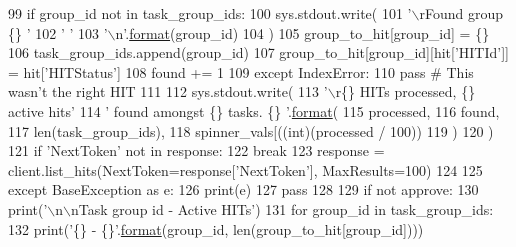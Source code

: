 \begin{DoxyCode}
99                         \textcolor{keywordflow}{if} group\_id \textcolor{keywordflow}{not} \textcolor{keywordflow}{in} task\_group\_ids:
100                             sys.stdout.write(
101                                 \textcolor{stringliteral}{'\(\backslash\)rFound group \{\}                         '}
102                                 \textcolor{stringliteral}{'                                         '}
103                                 \textcolor{stringliteral}{'\(\backslash\)n'}.\hyperlink{namespaceparlai_1_1chat__service_1_1services_1_1messenger_1_1shared__utils_a32e2e2022b824fbaf80c747160b52a76}{format}(group\_id)
104                             )
105                             group\_to\_hit[group\_id] = \{\}
106                             task\_group\_ids.append(group\_id)
107                         group\_to\_hit[group\_id][hit[\textcolor{stringliteral}{'HITId'}]] = hit[\textcolor{stringliteral}{'HITStatus'}]
108                         found += 1
109                 \textcolor{keywordflow}{except} IndexError:
110                     \textcolor{keywordflow}{pass}  \textcolor{comment}{# This wasn't the right HIT}
111 
112             sys.stdout.write(
113                 \textcolor{stringliteral}{'\(\backslash\)r\{\} HITs processed, \{\} active hits'}
114                 \textcolor{stringliteral}{' found amongst \{\} tasks. \{\}        '}.\hyperlink{namespaceparlai_1_1chat__service_1_1services_1_1messenger_1_1shared__utils_a32e2e2022b824fbaf80c747160b52a76}{format}(
115                     processed,
116                     found,
117                     len(task\_group\_ids),
118                     spinner\_vals[((int)(processed / 100)) %
119                 )
120             )
121             \textcolor{keywordflow}{if} \textcolor{stringliteral}{'NextToken'} \textcolor{keywordflow}{not} \textcolor{keywordflow}{in} response:
122                 \textcolor{keywordflow}{break}
123             response = client.list\_hits(NextToken=response[\textcolor{stringliteral}{'NextToken'}], MaxResults=100)
124 
125     \textcolor{keywordflow}{except} BaseException \textcolor{keyword}{as} e:
126         print(e)
127         \textcolor{keywordflow}{pass}
128 
129     \textcolor{keywordflow}{if} \textcolor{keywordflow}{not} approve:
130         print(\textcolor{stringliteral}{'\(\backslash\)n\(\backslash\)nTask group id - Active HITs'})
131         \textcolor{keywordflow}{for} group\_id \textcolor{keywordflow}{in} task\_group\_ids:
132             print(\textcolor{stringliteral}{'\{\} - \{\}'}.\hyperlink{namespaceparlai_1_1chat__service_1_1services_1_1messenger_1_1shared__utils_a32e2e2022b824fbaf80c747160b52a76}{format}(group\_id, len(group\_to\_hit[group\_id])))

\end{DoxyCode}
